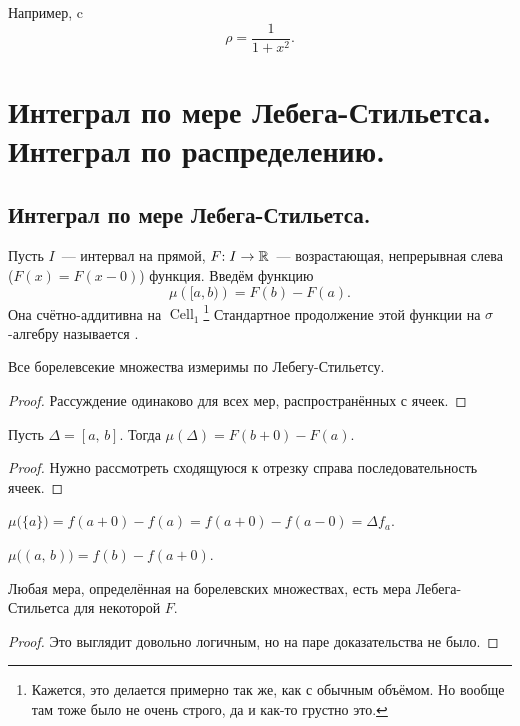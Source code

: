 \documentclass{notes}
\DeclareMathOperator{\Cell}{Cell}
\begin{document}
	\begin{exm}
		Например,  c 
		\[
			\rho = \dfrac{1}{1 + x^2}.
		\]
	\end{exm}

\section{Интеграл по мере Лебега-Стильетса. Интеграл по распределению.}
	
\subsection{Интеграл по мере Лебега-Стильетса.}
	\begin{de}
		Пусть $I$~--- интервал на прямой, $F \text{\text{:}} \; I \to \mathbb{R}$~--- возрастающая, непрерывная слева ($F(x) = F(x - 0)$) функция. Введём функцию
		\[
			\mu\left([a, b)\right) = F(b) - F(a).
		\]
		Она счётно-аддитивна на $\Cell_1$\footnote{Кажется, это делается примерно так же, как с обычным объёмом. Но вообще там тоже было не очень строго, да и как-то грустно это.} Стандартное продолжение этой функции на $\sigma$-алгебру называется .
	\end{de}

	\begin{st}
		Все борелевсекие множества измеримы по Лебегу-Стильетсу.
		\begin{proof}
			Рассуждение одинаково для всех мер, распространённых с ячеек.
		\end{proof}
	\end{st}

	\begin{pr}
		Пусть $\Delta = [a, \, b]$. Тогда $\mu(\Delta) = F(b + 0) - F(a)$.
		\begin{proof}
			Нужно рассмотреть сходящуюся к отрезку справа последовательность ячеек.
		\end{proof}
	\end{pr}

	\begin{pr}
		$\mu\big(\{a\}\big) = f(a + 0) - f(a) = f(a + 0) - f(a - 0) = \Delta f_a$.
	\end{pr}

	\begin{pr}
		$\mu\big((a, \, b)\big) = f(b) - f(a + 0)$.
	\end{pr}

	\begin{st}
		Любая мера, определённая на борелевских множествах, есть мера Лебега-Стильетса для некоторой $F$.
		\begin{proof}
			Это выглядит довольно логичным, но на паре доказательства не было.
		\end{proof}
	\end{st}
\end{document}
